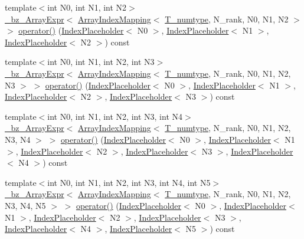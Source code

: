 \begin{DoxyCompactItemize}
\item 
{\footnotesize template$<$int N0, int N1, int N2$>$ }\\\hyperlink{class__bz__ArrayExpr}{\+\_\+bz\+\_\+\+Array\+Expr}$<$ \hyperlink{classArrayIndexMapping}{Array\+Index\+Mapping}$<$ \hyperlink{classArray_ae72770f4a1d2f8b7193badafc320f008}{T\+\_\+numtype}, N\+\_\+rank, N0, N1, N2 $>$ $>$ \hyperlink{classArray_afcbc859d658966fcc6a27d64a4c5a8ea}{operator()} (\hyperlink{classIndexPlaceholder}{Index\+Placeholder}$<$ N0 $>$, \hyperlink{classIndexPlaceholder}{Index\+Placeholder}$<$ N1 $>$, \hyperlink{classIndexPlaceholder}{Index\+Placeholder}$<$ N2 $>$) const 
\item 
{\footnotesize template$<$int N0, int N1, int N2, int N3$>$ }\\\hyperlink{class__bz__ArrayExpr}{\+\_\+bz\+\_\+\+Array\+Expr}$<$ \hyperlink{classArrayIndexMapping}{Array\+Index\+Mapping}$<$ \hyperlink{classArray_ae72770f4a1d2f8b7193badafc320f008}{T\+\_\+numtype}, N\+\_\+rank, N0, N1, N2, N3 $>$ $>$ \hyperlink{classArray_a844e0833f4c971a3e10941f574004c66}{operator()} (\hyperlink{classIndexPlaceholder}{Index\+Placeholder}$<$ N0 $>$, \hyperlink{classIndexPlaceholder}{Index\+Placeholder}$<$ N1 $>$, \hyperlink{classIndexPlaceholder}{Index\+Placeholder}$<$ N2 $>$, \hyperlink{classIndexPlaceholder}{Index\+Placeholder}$<$ N3 $>$) const 
\item 
{\footnotesize template$<$int N0, int N1, int N2, int N3, int N4$>$ }\\\hyperlink{class__bz__ArrayExpr}{\+\_\+bz\+\_\+\+Array\+Expr}$<$ \hyperlink{classArrayIndexMapping}{Array\+Index\+Mapping}$<$ \hyperlink{classArray_ae72770f4a1d2f8b7193badafc320f008}{T\+\_\+numtype}, N\+\_\+rank, N0, N1, N2, N3, N4 $>$ $>$ \hyperlink{classArray_a9bd9b6bdc5186a8c16ae8c3dff3fcc1d}{operator()} (\hyperlink{classIndexPlaceholder}{Index\+Placeholder}$<$ N0 $>$, \hyperlink{classIndexPlaceholder}{Index\+Placeholder}$<$ N1 $>$, \hyperlink{classIndexPlaceholder}{Index\+Placeholder}$<$ N2 $>$, \hyperlink{classIndexPlaceholder}{Index\+Placeholder}$<$ N3 $>$, \hyperlink{classIndexPlaceholder}{Index\+Placeholder}$<$ N4 $>$) const 
\item 
{\footnotesize template$<$int N0, int N1, int N2, int N3, int N4, int N5$>$ }\\\hyperlink{class__bz__ArrayExpr}{\+\_\+bz\+\_\+\+Array\+Expr}$<$ \hyperlink{classArrayIndexMapping}{Array\+Index\+Mapping}$<$ \hyperlink{classArray_ae72770f4a1d2f8b7193badafc320f008}{T\+\_\+numtype}, N\+\_\+rank, N0, N1, N2, N3, N4, N5 $>$ $>$ \hyperlink{classArray_a7103f84e38cb145dadd268084b3be0b3}{operator()} (\hyperlink{classIndexPlaceholder}{Index\+Placeholder}$<$ N0 $>$, \hyperlink{classIndexPlaceholder}{Index\+Placeholder}$<$ N1 $>$, \hyperlink{classIndexPlaceholder}{Index\+Placeholder}$<$ N2 $>$, \hyperlink{classIndexPlaceholder}{Index\+Placeholder}$<$ N3 $>$, \hyperlink{classIndexPlaceholder}{Index\+Placeholder}$<$ N4 $>$, \hyperlink{classIndexPlaceholder}{Index\+Placeholder}$<$ N5 $>$) const 

\end{DoxyCompactItemize}
